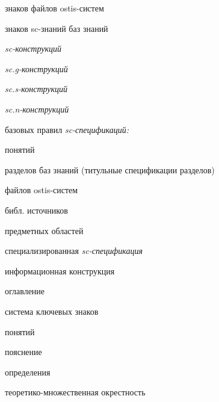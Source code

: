 \begin{SCn}
\begin{scnsubstruct}
{\begin{scnitemize}
{\begin{scnitemizeii}
                                \item{знаков файлов ostis-систем}
                                \item{знаков sc-знаний баз знаний}
                            \end{scnitemizeii}}
                \item{\textit{sc-конструкций}}
                \item{\textit{sc.g-конструкций}}
                \item{\textit{sc.s-конструкций}}
                \item{\textit{sc.n-конструкций}}
                \item{базовых правил \textit{sc-спецификаций:}
                            \begin{scnitemizeii}
                                \item{понятий}
                                \item{разделов баз знаний (титульные спецификации разделов)}
                                \item{файлов ostis-систем}
                                \item{библ. источников}
                                \item{предметных областей}
                            \end{scnitemizeii}}
                \item{специализированная \textit{sc-спецификация}
                            \begin{scnitemizeii}
                                \item{информационная конструкция
                                            \begin{scnitemizeiii}
                                                \item{оглавление}
                                                \item{система ключевых знаков}
                                            \end{scnitemizeiii}}
                                \item{понятий
                                            \begin{scnitemizeiii}
                                                \item{пояснение}
                                                \item{определения}
                                                \item{теоретико-множественная окрестность}

\end{scnitemizeiii}}
\end{scnitemizeii}}
\end{scnitemize}}
\end{scnsubstruct}
\end{SCn}
